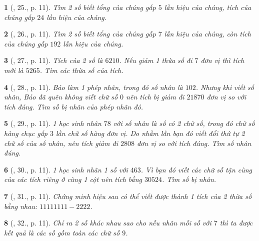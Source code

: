 \documentclass{article}
\newtheorem{baitoan}{}
\begin{document}
\begin{baitoan}[\cite{Binh_Toan_6_tap_1}, 25., p. 11]
	Tìm 2 số biết tổng của chúng gấp $5$ lần hiệu của chúng, tích của chúng gấp $24$ lần hiệu của chúng.
\end{baitoan}

\begin{baitoan}[\cite{Binh_Toan_6_tap_1}, 26., p. 11]
	Tìm 2 số biết tổng của chúng gấp $7$ lần hiệu của chúng, còn tích của chúng gấp $192$ lần hiệu của chúng.
\end{baitoan}

\begin{baitoan}[\cite{Binh_Toan_6_tap_1}, 27., p. 11]
	Tích của 2 số là $6210$. Nếu giảm 1 thừa số đi $7$ đơn vị thì tích mới là $5265$. Tìm các thừa số của tích.
\end{baitoan}

\begin{baitoan}[\cite{Binh_Toan_6_tap_1}, 28., p. 11]
	Bảo làm 1 phép nhân, trong đó số nhân là $102$. Nhưng khi viết số nhân, Bảo đã quên không viết chữ số $0$ nên tích bị giảm đi $21870$ đơn vị so với tích đúng. Tìm số bị nhân của phép nhân đó.
\end{baitoan}

\begin{baitoan}[\cite{Binh_Toan_6_tap_1}, 29., p. 11]
	1 học sinh nhân $78$ với số nhân là số có 2 chữ số, trong đó chữ số hàng chục gấp $3$ lần chữ số hàng đơn vị. Do nhầm lẫn bạn đó viết đổi thứ tự 2 chữ số của số nhân, nên tích giảm đi $2808$ đơn vị so với tích đúng. Tìm số nhân đúng.
\end{baitoan}

\begin{baitoan}[\cite{Binh_Toan_6_tap_1}, 30., p. 11]
	1 học sinh nhân 1 số với $463$. Vì bạn đó viết các chữ số tận cùng của các tích riêng ở cùng 1 cột nên tích bằng $30524$. Tìm số bị nhân.
\end{baitoan}

\begin{baitoan}[\cite{Binh_Toan_6_tap_1}, 31., p. 11]
	Chứng minh hiệu sau có thể viết được thành 1 tích của 2 thừa số bằng nhau: $11111111 - 2222$.
\end{baitoan}

\begin{baitoan}[\cite{Binh_Toan_6_tap_1}, 32., p. 11]
	Chỉ ra 2 số khác nhau sao cho nếu nhân mỗi số với $7$ thì ta được kết quả là các số gồm toàn các chữ số $9$.
\end{baitoan}
\end{document}
